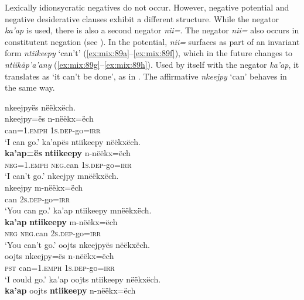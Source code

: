 \documentclass[output=paper,colorlinks,citecolor=brown,draft]{langscibook}
\begin{document}
Lexically idionsycratic negatives do not occur. However, negative potential and negative desiderative clauses exhibit a different structure. While the negator \textit{ka’ap} is used, there is also a second negator \textit{nii=}. The negator \textit{nii=} also occurs in constitutent negation (see ). In the potential, \textit{nii=} surfaces as part of an invariant form \textit{ntiikeepy} ‘can’t’ (\ref{ex:mix:89a}--\ref{ex:mix:89f}), which in the future changes to \textit{ntiikäp’a’any} (\ref{ex:mix:89g}--\ref{ex:mix:89h}). Used by itself with the negator \textit{ka’ap}, it translates as ‘it can’t be done’, as in . The affirmative \textit{nkeejpy} ‘can’ behaves in the same way. 

\ea\label{ex:mix:89}
    \ea\label{ex:mix:89a}
        \glll  nkeejpyës nëëkxëch.\\
             nkeejpy=ës n-nëëkx=ëch\\
             can=1.\textsc{emph} \textsc{1s.dep}{}-go=\textsc{irr}\\
        \glt ‘I can go.’
    \ex\label{ex:mix:89b}
        \glll ka’apës ntiikeepy nëëkxëch.\\ 
              \textbf{ka’ap=ës} \textbf{ntiikeepy} n-nëëkx=ëch\\
              \textsc{neg=}1.\textsc{emph} \textsc{neg}.can \textsc{1s.dep}{}-go=\textsc{irr}\\
        \glt ‘I can’t go.’
    \ex\label{ex:mix:89c}
        \glll nkeejpy mnëëkxëch.\\
             nkeejpy m-nëëkx=ëch\\
             can \textsc{2s.dep}{}-go=\textsc{irr}\\
        \glt ‘You can go.’
    \ex\label{ex:mix:89d}
        \glll ka’ap ntiikeepy mnëëkxëch. \\ 
              \textbf{ka’ap} \textbf{ntiikeepy} m-nëëkx=ëch\\
              \textsc{neg} \textsc{neg}.can \textsc{2s.dep}{}-go=\textsc{irr}\\
        \glt ‘You can’t go.’
    \ex\label{ex:mix:89e}
        \glll oojts nkeejpyës nëëkxëch. \\
             oojts nkeejpy=ës n-nëëkx=ëch \\
             \textsc{pst} can=1.\textsc{emph} \textsc{1s.dep}{}-go=\textsc{irr}\\
        \glt ‘I could go.’
    \ex\label{ex:mix:89f}
        \glll ka’ap oojts ntiikeepy nëëkxëch. \\ 
             \textbf{ka’ap} oojts \textbf{ntiikeepy} n-nëëkx=ëch \\
\end{document}

